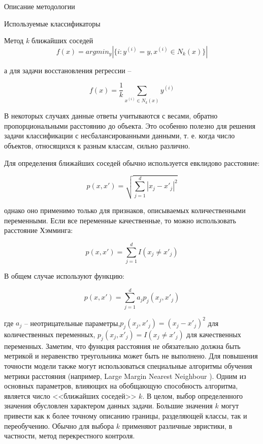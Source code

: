 \begin{section}{Описание методологии}
\begin{subsection}{Используемые классификаторы}
\begin{subsubsection}{Метод \textit{k} ближайших соседей}
      \begin{equation}
        f(x)=arg⁡min_{y}⁡|\{i\colon y^{(i)}=y, x^{(i)} \in N_k (x)\}|
      \end{equation}

      а для задачи восстановления регрессии –

      \begin{equation}
      f(x)=\frac{1}{k} \sum_{x^{(i)} \in N_k(x)}y^{(i)}
     \end{equation}

     В некоторых случаях данные ответы учитываются с весами, обратно пропорциональными расстоянию до объекта. Это особенно полезно для решения задачи классификации с несбалансированными данными, т. е. когда число объектов, относящихся к разным классам, сильно различно.

Для определения ближайших соседей обычно используется евклидово расстояние:

    \begin{equation}
      p(x,x') = \sqrt{\sum\limits_{j=1}^d |x_j - x'_j|^2}
    \end{equation}


    однако оно применимо только для признаков, описываемых количественными переменными. Если все переменные качественные, то можно использовать расстояние Хэмминга:

    \begin{equation}
      p(x,x') = \sum\limits_{j=1}^d I(x_j \neq x'_j)
    \end{equation}

    В общем случае используют функцию:

\begin{equation}
  p(x,x')=\sum\limits_{j=1}^d a_j p_j (x_j,x'_j)
\end{equation}

    где $a_j$ – неотрицательные параметры,$p_j(x_j,x'_j)=(x_j-x'_j)^2$  для количественных переменных, $p_j(x_j,x'_j)=I(x_j \neq x'_j)$  для качественных переменных. Заметим, что функция расстояния не обязательно должна быть метрикой и неравенство треугольника может быть не выполнено.
Для повышения точности модели также могут использоваться специальные алгоритмы обучения метрики расстояния (например, Large Margin Nearest Neighbour \cite{Weinberger}).
Одним из основных параметров, влияющих на обобщающую способность алгоритма, является число <<ближайших соседей>>  $k$. В целом, выбор определенного значения обусловлен характером данных задачи. Большие значения $k$ могут привести как к более точному описанию границы, разделяющей классы, так и переобучению. Обычно для выбора $k$ применяют различные эвристики, в частности, метод перекрестного контроля.


\end{subsubsection}
\end{subsection}
\end{section}
